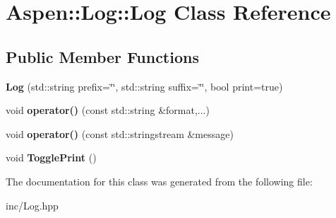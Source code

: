 \hypertarget{class_aspen_1_1_log_1_1_log}{\section{Aspen\-:\-:Log\-:\-:Log Class Reference}
\label{class_aspen_1_1_log_1_1_log}
}
\subsection*{Public Member Functions}
\begin{DoxyCompactItemize}
\item 
\hypertarget{class_aspen_1_1_log_1_1_log_a7cd40b18a98f7849ffd0445b1a601634}{{\bfseries Log} (std\-::string prefix=\char`\"{}\char`\"{}, std\-::string suffix=\char`\"{}\char`\"{}, bool print=true)}\label{class_aspen_1_1_log_1_1_log_a7cd40b18a98f7849ffd0445b1a601634}

\item 
\hypertarget{class_aspen_1_1_log_1_1_log_a00c59066f5b3e9385b4ed23d5f75092b}{void {\bfseries operator()} (const std\-::string \&format,...)}\label{class_aspen_1_1_log_1_1_log_a00c59066f5b3e9385b4ed23d5f75092b}

\item 
\hypertarget{class_aspen_1_1_log_1_1_log_a0afd4a9bebc71be10b94a8d910d99336}{void {\bfseries operator()} (const std\-::stringstream \&message)}\label{class_aspen_1_1_log_1_1_log_a0afd4a9bebc71be10b94a8d910d99336}

\item 
\hypertarget{class_aspen_1_1_log_1_1_log_a7aa60eb49286c091b56062c96dc09abf}{void {\bfseries Toggle\-Print} ()}\label{class_aspen_1_1_log_1_1_log_a7aa60eb49286c091b56062c96dc09abf}

\end{DoxyCompactItemize}


The documentation for this class was generated from the following file\-:\begin{DoxyCompactItemize}
\item 
inc/Log.\-hpp\end{DoxyCompactItemize}
